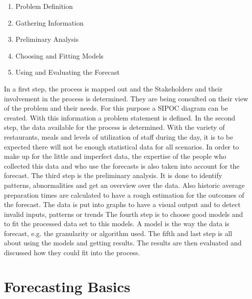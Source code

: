 \begin{enumerate}
\item Problem Definition
\item Gathering Information
\item Preliminary Analysis
\item Choosing and Fitting Models
\item Using and Evaluating the Forecast
\end{enumerate}

In a first step, the process is mapped out and the Stakeholders and their involvement in the process is determined. They are being consulted on their view of the problem and their needs. For this purpose a SIPOC diagram can be created. With this information a problem statement is defined.\newline
In the second step, the data available for the process is determined. With the variety of restaurants, meals and levels of utilization of staff during the day, it is to be expected there will not be enough statistical data for all scenarios. In order to make up for the little and imperfect data, the expertise of the people who collected this data and who use the forecasts is also taken into account for the forecast.\newline
The third step is the preliminary analysis. It is done to identify patterns, abnormalities and get an overview over the data. Also historic average preparation times are calculated to have a rough estimation for the outcomes of the forecast. The data is put into graphs to have a visual output and to detect invalid inputs, patterns or trends\newline
The fourth step is to choose good models and to fit the processed data set to this models. A model is the way the data is forecast, e.g. the granularity or algorithm used.\newline
The fifth and last step is all about using the models and getting results. The results are then evaluated and discussed how they could fit into the process.
\section{Forecasting Basics}\label{section:Forecast Basics}
